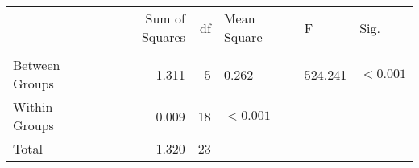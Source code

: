 \begin{tabular}{lrrlll}
\toprule
 & Sum of Squares & df & Mean Square & F & Sig. \\
 &  &  &  &  &  \\
\midrule
Between Groups & 1.311 & 5 & 0.262 & 524.241 & $< 0.001$ \\
Within Groups & 0.009 & 18 & $< 0.001$ &  &  \\
Total & 1.320 & 23 &  &  &  \\
\bottomrule
\end{tabular}
